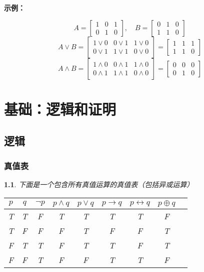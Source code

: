 \documentclass[UTF8]{report}
\theoremstyle{MyLineTheoremStyle} %
\theoremstyle{MyBlockTheoremStyle} %
\theoremstyle{MySubsubsectionStyle} %
\newtheorem{definition}{}
\begin{document}
\textbf{示例：}\par
        \[
        A =
        \begin{bmatrix}
        1 & 0 & 1 \\
        0 & 1 & 0
        \end{bmatrix}
        , \quad
        B =
        \begin{bmatrix}
        0 & 1 & 0 \\
        1 & 1 & 0
        \end{bmatrix}
        \]
        \[
        A \lor B =
        \begin{bmatrix}
        1 \lor 0 & 0 \lor 1 & 1 \lor 0 \\
        0 \lor 1 & 1 \lor 1 & 0 \lor 0
        \end{bmatrix}
        =
        \begin{bmatrix}
        1 & 1 & 1 \\
        1 & 1 & 0
        \end{bmatrix}
        \]
        \[
        A \land B =
        \begin{bmatrix}
        1 \land 0 & 0 \land 1 & 1 \land 0 \\
        0 \land 1 & 1 \land 1 & 0 \land 0
        \end{bmatrix}
        =
        \begin{bmatrix}
        0 & 0 & 0 \\
        0 & 1 & 0
        \end{bmatrix}
        \]
    

        \chapter{基础：逻辑和证明}\thispagestyle{fancy} 

        \section{逻辑}
        
        
        
        \subsection{真值表}
        \begin{definition}
        下面是一个包含所有真值运算的真值表（包括异或运算）
        \begin{table}[H]
        \centering
        \begin{tabular}{|c|c|c|c|c|c|c|c|c|}
        \hline
        $p$ & $q$ & $\neg p$ & $p \land q$ & $p \lor q$ & $p \rightarrow q$ & $p \leftrightarrow q$ & $p \oplus q$  \\
        \hline
        T & T & F & T & T & T & T & F  \\
        T & F & F & F & T & F & F & T  \\
        F & T & T & F & T & T & F & T  \\
        F & F & T & F & F & T & T & F  \\
        \hline
        \end{tabular}
        \end{table}
        \end{definition}
        
\end{document}

